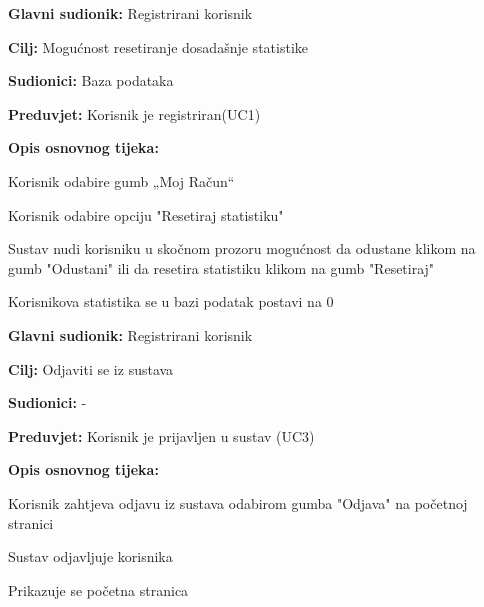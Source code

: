 										\noindent {}
					\begin{packed_item}
						
						\item \textbf{Glavni sudionik: } Registrirani korisnik
						\item  \textbf{Cilj:} Mogućnost resetiranje dosadašnje statistike
						\item  \textbf{Sudionici:} Baza podataka
						\item  \textbf{Preduvjet:} Korisnik je registriran(UC1)
						\item  \textbf{Opis osnovnog tijeka:}
						
						\item[] \begin{packed_enum}
							
							\item Korisnik odabire gumb „Moj Račun“
							\item Korisnik  odabire opciju "Resetiraj statistiku"
							\item Sustav nudi korisniku u skočnom prozoru mogućnost da odustane klikom na gumb "Odustani" ili da resetira statistiku klikom na gumb "Resetiraj" 
							\item Korisnikova statistika se u bazi podatak postavi na 0
						\end{packed_enum}
					\end{packed_item}
				
				
				    	\noindent \underbar{\textbf{UC6 - odjava}}
				    \begin{packed_item}
				    	
				    	\item \textbf{Glavni sudionik: } Registrirani korisnik
				    	\item  \textbf{Cilj:} Odjaviti se iz sustava
				    	\item  \textbf{Sudionici:} -
				    	\item  \textbf{Preduvjet:} Korisnik je prijavljen u sustav (UC3)
				    	\item  \textbf{Opis osnovnog tijeka:}
				    	
				    	\item[] \begin{packed_enum}
				    		
				    		\item Korisnik zahtjeva odjavu iz sustava odabirom gumba "Odjava" na početnoj stranici
				    		\item Sustav odjavljuje korisnika
				    		\item Prikazuje se početna stranica
				    	\end{packed_enum}
				    \end{packed_item}
						
